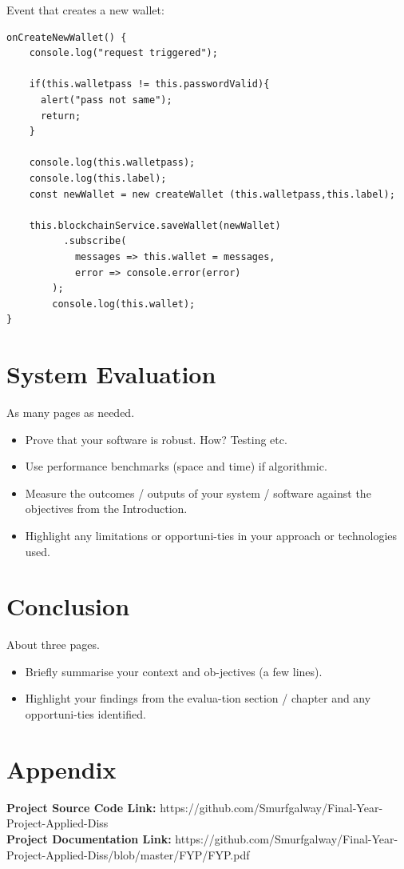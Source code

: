 Event that creates a new wallet:
\begin{lstlisting}
onCreateNewWallet() {
    console.log("request triggered");

    if(this.walletpass != this.passwordValid){
      alert("pass not same");
      return;
    }

    console.log(this.walletpass);
    console.log(this.label);
    const newWallet = new createWallet (this.walletpass,this.label);
    
    this.blockchainService.saveWallet(newWallet)
          .subscribe(
            messages => this.wallet = messages,
            error => console.error(error)
        );
        console.log(this.wallet);
}
\end{lstlisting}


\chapter{System Evaluation}
As many pages as needed.
\begin{itemize}
\item Prove that your software is robust. How? Testing etc. 
\item Use performance benchmarks (space and time) if algorithmic.
\item Measure the outcomes / outputs of your system / software against the objectives from the Introduction.
\item Highlight any limitations or opportuni-ties in your approach or technologies used.
\end{itemize}

\chapter{Conclusion}
About three pages.

\begin{itemize}
\item Briefly summarise your context and ob-jectives (a few lines).
\item Highlight your findings from the evalua-tion section / chapter and any opportuni-ties identified.
\end{itemize}

\chapter{Appendix}
\textbf{Project Source Code Link: } https://github.com/Smurfgalway/Final-Year-Project-Applied-Diss \\
\textbf{Project Documentation Link: } https://github.com/Smurfgalway/Final-Year-Project-Applied-Diss/blob/master/FYP/FYP.pdf\\